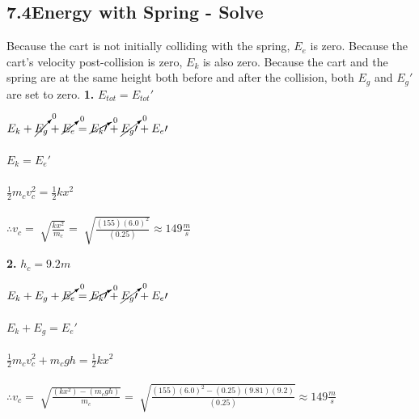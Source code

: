 \subsection*{7.4\hspace*{0.5cm}Energy with Spring - Solve}
Because the cart is not initially colliding with the spring, $E_{e}$ is zero. Because the cart's velocity post-collision is zero, $E_{k}$ is also zero. Because the cart and the spring are at the same height both before and after the collision, both $E_{g}$ and $E_{g}\prime$ are set to zero.\newline\newline
\textbf{1.} $E_{tot} = E_{tot}\prime$ \\
\begin{adjustwidth}{0.6cm}{0pt}
    $E_{k} + \cancelto{0}{E_{g}} + \cancelto{0}{E_{e}} = \cancelto{0}{E_{k}\prime} + \cancelto{0}{E_{g}\prime} + E_{e}\prime$ \\\\
    $E_{k} = E_{e}\prime$ \\\\
    $\frac{1}{2}m_{c}v_{c}^2 = \frac{1}{2}kx^2$ \\\\
    $\therefore v_{c} = \sqrt[]{\frac{kx^2}{m_{c}}} = \sqrt[]{\frac{(155){(6.0)}^2}{(0.25)}} \approx 149\frac{m}{s}$
\end{adjustwidth}\vspace*{15pt}
\textbf{2.} $h_{c} = 9.2m$ \\
\begin{adjustwidth}{0.6cm}{0pt}
    $E_{k} + E_{g} + \cancelto{0}{E_{e}} = \cancelto{0}{E_{k}\prime} + \cancelto{0}{E_{g}\prime} + E_{e}\prime$ \\\\
    $E_{k} + E_{g} = E_{e}\prime$ \\\\
    $\frac{1}{2}m_{c}v_{c}^2 + m_{c}gh = \frac{1}{2}kx^2$ \\\\
    $\therefore v_{c} = \sqrt[]{\frac{(kx^2) - (m_{c}gh)}{m_{c}}} = \sqrt[]{\frac{(155){(6.0)}^2 - (0.25)(9.81)(9.2)}{(0.25)}} \approx 149\frac{m}{s}$
\end{adjustwidth}\vspace*{15pt}
